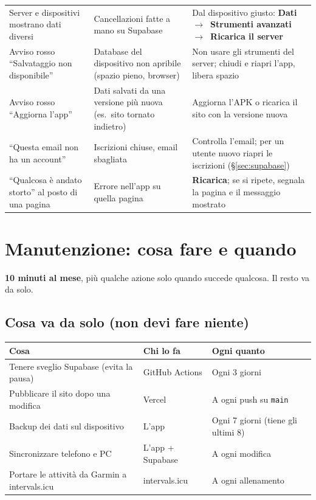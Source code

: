 \documentclass[11pt,a4paper]{article}
\newcommand{\thead}[1]{\textbf{\color{accent}#1}}
\newcommand{\ra}{\unskip\nobreak\ $\rightarrow$\ \ignorespaces}            %
\newcommand{\bt}[1]{\textbf{#1}}               %
\newcommand{\code}[1]{\texttt{#1}}             %
\newcommand{\sezione}[1]{\S\ref{#1}}           %
\begin{document}
{\begin{tabularx}{\textwidth}{L{4.2cm}L{4.4cm}Y}
  Server e dispositivi mostrano dati diversi & Cancellazioni fatte a mano su Supabase &
    Dal dispositivo giusto: \bt{Dati \ra Strumenti avanzati \ra Ricarica il server} \\
  Avviso rosso ``Salvataggio non disponibile'' & Database del dispositivo non apribile
    (spazio pieno, browser) & Non usare gli strumenti del server; chiudi e riapri l'app, libera spazio \\
  Avviso rosso ``Aggiorna l'app'' & Dati salvati da una versione più nuova (es.\ sito tornato
    indietro) & Aggiorna l'APK o ricarica il sito con la versione nuova \\
  ``Questa email non ha un account'' & Iscrizioni chiuse, email sbagliata &
    Controlla l'email; per un utente nuovo riapri le iscrizioni (\sezione{sec:supabase}) \\
  ``Qualcosa è andato storto'' al posto di una pagina & Errore nell'app su quella pagina &
    \bt{Ricarica}; se si ripete, segnala la pagina e il messaggio mostrato \\
\bottomrule
\end{tabularx}
}

\section{Manutenzione: cosa fare e quando}\label{sec:manutenzione}

\begin{consiglio}[In breve]
\bt{10 minuti al mese}, più qualche azione solo quando succede qualcosa. Il resto va da solo.
\end{consiglio}

\subsection*{Cosa va da solo (non devi fare niente)}

\begin{tabularx}{\textwidth}{YL{3.4cm}L{4.6cm}}
  \toprule \thead{Cosa} & \thead{Chi lo fa} & \thead{Ogni quanto} \\ \midrule
  Tenere sveglio Supabase (evita la pausa) & GitHub Actions & Ogni 3 giorni \\
  Pubblicare il sito dopo una modifica & Vercel & A ogni push su \code{main} \\
  Backup dei dati sul dispositivo & L'app & Ogni 7 giorni (tiene gli ultimi 8) \\
  Sincronizzare telefono e PC & L'app + Supabase & A ogni modifica \\
  Portare le attività da Garmin a intervals.icu & intervals.icu & A ogni allenamento \\
\bottomrule
\end{tabularx}
\end{document}
